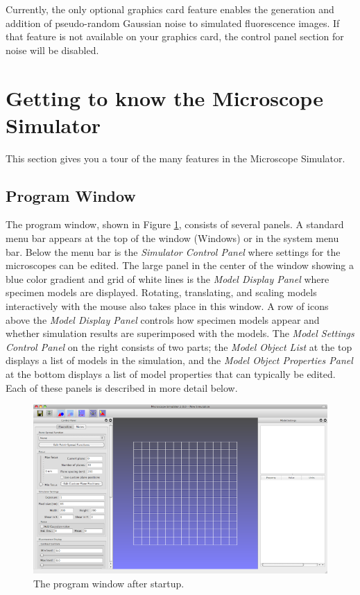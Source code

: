 \documentclass[11pt]{article}
\begin{document}
Currently, the only optional graphics card feature enables the generation and addition of pseudo-random Gaussian noise to simulated fluorescence images. If that feature is not available on your graphics card, the control panel section for noise will be disabled.

\section{Getting to know the Microscope Simulator}

This section gives you a tour of the many features in the Microscope Simulator.

\subsection{Program Window}

The program window, shown in Figure \ref{fig:ProgramWindow}, consists of several panels. A standard menu bar appears at the top of the window (Windows) or in the system menu bar. Below the menu bar is the \emph{Simulator Control Panel} where settings for the microscopes can be edited. The large panel in the center of the window showing a blue color gradient and grid of white lines is the \emph{Model Display Panel} where specimen models are displayed. Rotating, translating, and scaling models interactively with the mouse also takes place in this window. A row of icons above the \emph{Model Display Panel} controls how specimen models appear and whether simulation results are superimposed with the models. The \emph{Model Settings Control Panel} on the right consists of two parts; the \emph{Model Object List} at the top displays a list of models in the simulation, and the \emph{Model Object Properties Panel} at the bottom displays a list of model properties that can typically be edited. Each of these panels is described in more detail below.

\begin{figure}[htbp] %
   \centering
   \includegraphics[width=1\linewidth]{images/ProgramWindow-small} 
   \caption{The program window after startup.}
   \label{fig:ProgramWindow}
\end{figure}
\end{document}
